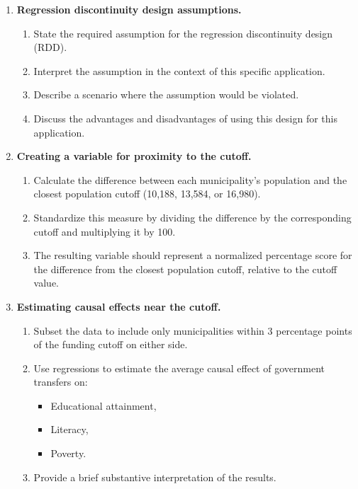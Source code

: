 \documentclass[12pt]{article}
\begin{document}
\begin{enumerate}
    \item \textbf{Regression discontinuity design assumptions.}
    \begin{enumerate}[label=(\alph*)]
        \item State the required assumption for the regression discontinuity design (RDD).
        \item Interpret the assumption in the context of this specific application.
        \item Describe a scenario where the assumption would be violated.
        \item Discuss the advantages and disadvantages of using this design for this application.
    \end{enumerate}

    \item \textbf{Creating a variable for proximity to the cutoff.}
    \begin{enumerate}[label=(\alph*)]
        \item Calculate the difference between each municipality’s population and the closest population cutoff (10,188, 13,584, or 16,980).
        \item Standardize this measure by dividing the difference by the corresponding cutoff and multiplying it by 100.
        \item The resulting variable should represent a normalized percentage score for the difference from the closest population cutoff, relative to the cutoff value.
    \end{enumerate}

    \item \textbf{Estimating causal effects near the cutoff.}
    \begin{enumerate}[label=(\alph*)]
        \item Subset the data to include only municipalities within 3 percentage points of the funding cutoff on either side.
        \item Use regressions to estimate the average causal effect of government transfers on:
        \begin{itemize}
            \item Educational attainment,
            \item Literacy,
            \item Poverty.
        \end{itemize}
        \item Provide a brief substantive interpretation of the results.
    \end{enumerate}


\end{enumerate}
\end{document}
